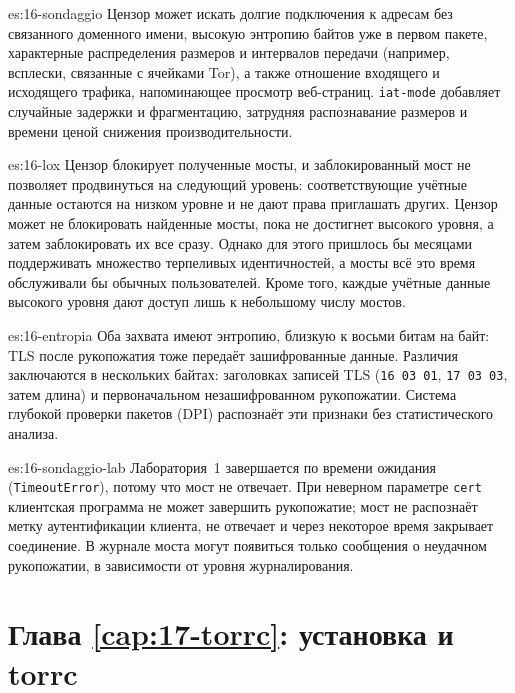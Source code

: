 \begin{soluzione}{es:16-sondaggio}
Цензор может искать долгие подключения к адресам без связанного доменного имени, высокую энтропию байтов уже в первом пакете, характерные распределения размеров и интервалов передачи (например, всплески, связанные с ячейками Tor), а также отношение входящего и исходящего трафика, напоминающее просмотр веб-страниц. \texttt{iat-mode} добавляет случайные задержки и фрагментацию, затрудняя распознавание размеров и времени ценой снижения производительности.
\end{soluzione}

\begin{soluzione}{es:16-lox}
Цензор блокирует полученные мосты, и заблокированный мост не позволяет продвинуться на следующий уровень: соответствующие учётные данные остаются на низком уровне и не дают права приглашать других. Цензор может не блокировать найденные мосты, пока не достигнет высокого уровня, а затем заблокировать их все сразу. Однако для этого пришлось бы месяцами поддерживать множество терпеливых идентичностей, а мосты всё это время обслуживали бы обычных пользователей. Кроме того, каждые учётные данные высокого уровня дают доступ лишь к небольшому числу мостов.
\end{soluzione}

\begin{soluzione}{es:16-entropia}
Оба захвата имеют энтропию, близкую к восьми битам на байт: TLS после рукопожатия тоже передаёт зашифрованные данные. Различия заключаются в нескольких байтах: заголовках записей TLS (\texttt{16 03 01}, \texttt{17 03 03}, затем длина) и первоначальном незашифрованном рукопожатии. Система глубокой проверки пакетов (DPI) распознаёт эти признаки без статистического анализа.
\end{soluzione}

\begin{soluzione}{es:16-sondaggio-lab}
Лаборатория~1 завершается по времени ожидания (\texttt{TimeoutError}), потому что мост не отвечает. При неверном параметре \texttt{cert} клиентская программа  не может завершить рукопожатие; мост не распознаёт метку аутентификации клиента, не отвечает и через некоторое время закрывает соединение. В журнале моста могут появиться только сообщения о неудачном рукопожатии, в зависимости от уровня журналирования.
\end{soluzione}

\section*{Глава \ref{cap:17-torrc}: установка и torrc}

